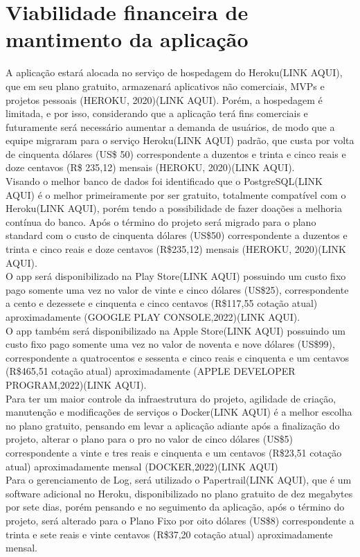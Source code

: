 \section{Viabilidade financeira de mantimento da aplicação}
A aplicação estará alocada no serviço de hospedagem do Heroku(LINK AQUI), que em seu plano gratuito, armazenará aplicativos não comerciais, MVPs e projetos pessoais (HEROKU, 2020)(LINK AQUI). Porém, a hospedagem é limitada, e por isso, considerando que a aplicação terá fins comerciais e futuramente será necessário aumentar a demanda de usuários, de modo que a equipe migraram para o serviço Heroku(LINK AQUI) padrão, que custa por volta de cinquenta dólares (US\$ 50) correspondente a duzentos e trinta e cinco reais e doze centavos (R\$ 235,12) mensais (HEROKU, 2020)(LINK AQUI).\\
Visando o melhor banco de dados foi identificado que o PostgreSQL(LINK AQUI) é o melhor primeiramente por ser gratuito, totalmente compatível com o Heroku(LINK AQUI), porém tendo a possibilidade de fazer doações a melhoria contínua do banco. Após o término do projeto será migrado para o plano standard com o custo de cinquenta dólares (US\$50) correspondente a duzentos e trinta e cinco reais e doze centavos (R\$235,12) mensais (HEROKU, 2020)(LINK AQUI).\\
O app será disponibilizado na Play Store(LINK AQUI) possuindo um custo fixo pago somente uma vez no valor de vinte e cinco dólares (US\$25), correspondente a cento e dezessete e cinquenta e cinco centavos  (R\$117,55 cotação atual) aproximadamente (GOOGLE PLAY CONSOLE,2022)(LINK AQUI).\\
O app também será disponibilizado na Apple Store(LINK AQUI) possuindo um custo fixo pago somente uma vez no valor de noventa e nove dólares (US\$99), correspondente a quatrocentos e sessenta e cinco reais e cinquenta e um centavos (R\$465,51 cotação atual) aproximadamente (APPLE DEVELOPER PROGRAM,2022)(LINK AQUI).\\
Para ter um maior controle da infraestrutura do projeto, agilidade de criação, manutenção e modificações de serviços o Docker(LINK AQUI) é a melhor escolha no plano gratuito, pensando em levar a aplicação adiante após a finalização do projeto, alterar o plano para o pro no valor de cinco dólares (US\$5) correspondente a vinte e tres reais e cinquenta e um centavos (R\$23,51 cotação atual) aproximadamente mensal (DOCKER,2022)(LINK AQUI)\\
Para o gerenciamento de Log, será utilizado o Papertrail(LINK AQUI), que é um software adicional no Heroku, disponibilizado no plano gratuito de dez megabytes por sete dias, porém pensando e no seguimento da aplicação, após o término do projeto, será alterado para o Plano Fixo por oito dólares (US\$8) correspondente a trinta e sete reais e vinte centavos (R\$37,20 cotação atual) aproximadamente mensal.\\
